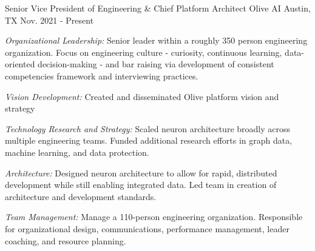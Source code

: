 \begin{cventries}


\cventry
{Senior Vice President of Engineering \& Chief Platform Architect}
{Olive AI}
{Austin, TX}
{Nov. 2021 - Present}
{
  \begin{cvitems}
    \item{\emph{Organizational Leadership:} Senior leader within a roughly 350 person engineering organization. Focus on engineering culture - curiosity, continuous learning, data-oriented decision-making - and bar raising via development of consistent competencies framework and interviewing practices.}
    \item{\emph{Vision Development:} Created and disseminated Olive platform vision and strategy}
    \item{\emph{Technology Research and Strategy:} Scaled neuron architecture broadly across multiple engineering teams. Funded additional research efforts in graph data, machine learning, and data protection. }
    \item{\emph{Architecture:} Designed neuron architecture to allow for rapid, distributed development while still enabling integrated data. Led team in creation of architecture and development standards. }
    \item{\emph{Team Management:} Manage a 110-person engineering organization. Responsible for organizational design, communications, performance management, leader coaching, and resource planning.}
  \end{cvitems}
}



\end{cventries}
